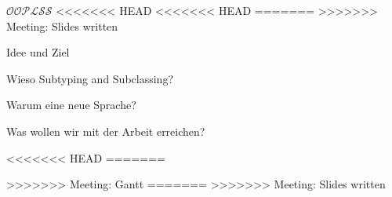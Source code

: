 \begin{frame}[t]{$\mathcal{OOPLSS}$}
<<<<<<< HEAD
<<<<<<< HEAD
=======
>>>>>>> Meeting: Slides written
  \begin{bigitemize}[<+->]{3mm}
		\item Idee und Ziel
		\item Wieso Subtyping and Subclassing?
		\item Warum eine neue Sprache?
		\item Was wollen wir mit der Arbeit erreichen?
	\end{bigitemize}
<<<<<<< HEAD
=======

>>>>>>> Meeting: Gantt
=======
>>>>>>> Meeting: Slides written
\end{frame}
